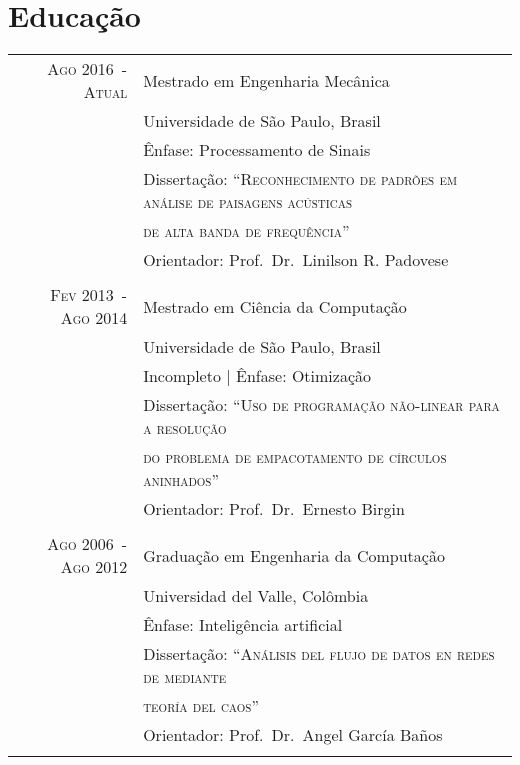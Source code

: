 \documentclass[a4paper,10pt]{article}
\begin{document}
\section{Educação}
\begin{tabular}{rl}	

    \textsc{Ago 2016~-~Atual}       & Mestrado em Engenharia Mecânica\\
                                    & Universidade de São Paulo, Brasil \\
                                    & Ênfase: Processamento de Sinais \\
                                    & Dissertação: ``\textsc{Reconhecimento de padrões em análise de paisagens acústicas}\\
                                    & \textsc{de alta banda de frequência}'' \\
                                    & Orientador: Prof.~Dr.~Linilson R. Padovese \\
                                    &\\

    \textsc{Fev 2013~-~Ago 2014}    & Mestrado em Ciência da Computação\\
                                    & Universidade de São Paulo, Brasil \\
                                    & Incompleto | Ênfase: Otimização \\
                                    & Dissertação: ``\textsc{Uso de programação não-linear para a resolução}\\
                                    & \textsc{do problema de empacotamento de círculos aninhados}'' \\
                                    & Orientador: Prof.~Dr.~Ernesto Birgin \\
                                    &\\

    \textsc{Ago 2006~-~Ago 2012}    & Graduação em Engenharia da Computação\\
                                    & Universidad del Valle, Colômbia \\
                                    & Ênfase: Inteligência artificial \\
                                    & Dissertação: ``\textsc{Análisis del flujo de datos en redes de mediante}\\
                                    & \textsc{teoría del caos}'' \\
                                    & Orientador: Prof.~Dr.~Angel García Baños \\
                                    &\\


\end{tabular}
\end{document}
